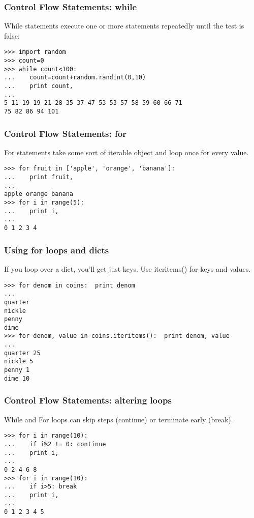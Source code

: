 \documentclass[10pt]{beamer}
\newcommand\smallfont{\fontsize{8pt}{7.2}\selectfont}
\begin{document}
\begin{frame}[fragile]
\frametitle{Control Flow Statements: while}

While statements execute one or more statements repeatedly until the 
test is false:

\begin{verbatim}
>>> import random
>>> count=0
>>> while count<100:
...    count=count+random.randint(0,10)
...    print count,
... 
5 11 19 19 21 28 35 37 47 53 53 57 58 59 60 66 71   
75 82 86 94 101 
\end{verbatim}

\end{frame}


\begin{frame}[fragile]
\frametitle{Control Flow Statements: for}

For statements take some sort of iterable object and loop once for 
every value.

\begin{verbatim}
>>> for fruit in ['apple', 'orange', 'banana']:
...    print fruit, 
... 
apple orange banana
>>> for i in range(5):
...    print i,
... 
0 1 2 3 4 

\end{verbatim}

\end{frame}

\begin{frame}[fragile]
\frametitle{Using for loops and dicts}
If you loop over a dict, you'll get just keys.  Use iteritems() for keys and values.

\smallfont
\begin{verbatim}
>>> for denom in coins:  print denom
... 
quarter
nickle
penny
dime
>>> for denom, value in coins.iteritems():  print denom, value
... 
quarter 25
nickle 5
penny 1
dime 10

\end{verbatim}
\end{frame}


\begin{frame}[fragile]
\frametitle{Control Flow Statements: altering loops}

While and For loops can skip steps (continue) or terminate early (break).

\begin{verbatim}
>>> for i in range(10):
...    if i%2 != 0: continue
...    print i, 
... 
0 2 4 6 8
>>> for i in range(10):
...    if i>5: break
...    print i,
... 
0 1 2 3 4 5
\end{verbatim}

\end{frame}
\end{document}
